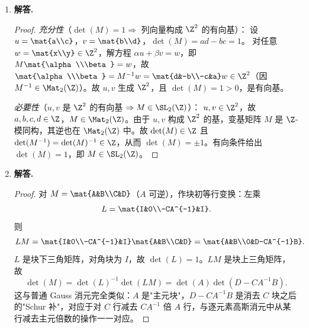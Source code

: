 \begin{enumerate}[label=\textbf{\arabic*.}, leftmargin=*, itemsep=1em]
  \emph{$ST$ 的不动点}：$ST=\mat{0&-1\\1&1}$，故 $(ST)\cdot\tau=\tfrac{-1}{\tau+1}=\tau$，即 $\tau(\tau+1)=-1$，$\tau^2+\tau+1=0$，解得
  \[
    \tau=\frac{-1+\sqrt{-3}}{2}=e^{2\pi i/3}=\rho,\quad \Im(\rho)=\tfrac{\sqrt3}{2}>0.
  \]
  这两个点 $i$ 与 $\rho$ 是 $\PSL_2(\Z)$ 在上半平面作用的\emph{椭圆点}（稳定化子非平凡）。在模形式理论中，这些点是基本域的顶点，模形式在其附近的 Fourier–Taylor 展开带来特殊的零点条件，并出现在维数公式中。

  \item \textbf{解答.}
  \begin{proof}
  \emph{充分性}（$\det(M)=1\Rightarrow$ 列向量构成 $\Z^2$ 的有向基）：
  设 $u=\mat{a\\c}$，$v=\mat{b\\d}$，$\det(M)=ad-bc=1$。
  对任意 $w=\mat{x\\y}\in\Z^2$，解方程 $\alpha u+\beta v=w$，即 $M\mat{\alpha\\\beta}=w$，故 $\mat{\alpha\\\beta}=M^{-1}w=\mat{d&-b\\-c&a}w\in\Z^2$（因 $M^{-1}\in\Mat_2(\Z)$）。故 $u,v$ 生成 $\Z^2$，且 $\det(M)=1>0$，是有向基。

  \emph{必要性}（$u,v$ 是 $\Z^2$ 的有向基 $\Rightarrow M\in\SL_2(\Z)$）：
  $u,v\in\Z^2$，故 $a,b,c,d\in\Z$，$M\in\Mat_2(\Z)$。由于 $u,v$ 构成 $\Z^2$ 的基，变基矩阵 $M$ 是 $\Z$-模同构，其逆也在 $\Mat_2(\Z)$ 中。故 $\det(M)\in\Z$ 且 $\det(M^{-1})=\det(M)^{-1}\in\Z$，从而 $\det(M)=\pm1$。有向条件给出 $\det(M)=1$，即 $M\in\SL_2(\Z)$。
  \end{proof}

  \item \textbf{解答.}
  \begin{proof}
  对 $M=\mat{A&B\\C&D}$（$A$ 可逆），作块初等行变换：左乘
  \[
    L=\mat{I&0\\-CA^{-1}&I}.
  \]
  则
  \[
    LM=\mat{I&0\\-CA^{-1}&I}\mat{A&B\\C&D}
      =\mat{A&B\\0&D-CA^{-1}B}.
  \]
  $L$ 是块下三角矩阵，对角块为 $I$，故 $\det(L)=1$。$LM$ 是块上三角矩阵，故
  \[
    \det(M)=\det(L)^{-1}\det(LM)=\det(A)\det(D-CA^{-1}B).
  \]
  这与普通 Gauss 消元完全类似：$A$ 是"主元块"，$D-CA^{-1}B$ 是消去 $C$ 块之后的"Schur 补"，对应于对 $C$ 行减去 $CA^{-1}$ 倍 $A$ 行，与逐元素高斯消元中从某行减去主元倍数的操作一一对应。
  \end{proof}


\end{enumerate}
